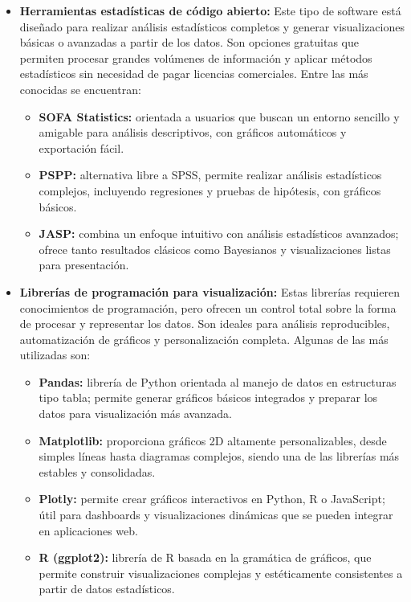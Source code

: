 \documentclass{../../miPlantilla}
\begin{document}
\begin{itemize}
    \item \textbf{Herramientas estadísticas de código abierto:}  
    Este tipo de software está diseñado para realizar análisis estadísticos completos y generar visualizaciones básicas o
    avanzadas a partir de los datos. Son opciones gratuitas que permiten procesar grandes volúmenes de información y aplicar
    métodos estadísticos sin necesidad de pagar licencias comerciales. Entre las más conocidas se encuentran:  
    \begin{itemize}
        \item \textbf{SOFA Statistics:} orientada a usuarios que buscan un entorno sencillo y amigable para análisis descriptivos,
        con gráficos automáticos y exportación fácil.  
        \item \textbf{PSPP:} alternativa libre a SPSS, permite realizar análisis estadísticos complejos, incluyendo regresiones y
        pruebas de hipótesis, con gráficos básicos.  
        \item \textbf{JASP:} combina un enfoque intuitivo con análisis estadísticos avanzados; ofrece tanto resultados clásicos
        como Bayesianos y visualizaciones listas para presentación.
    \end{itemize}

    \item \textbf{Librerías de programación para visualización:}  
    Estas librerías requieren conocimientos de programación, pero ofrecen un control total sobre la forma de procesar y representar
    los datos. Son ideales para análisis reproducibles, automatización de gráficos y personalización completa. Algunas de las más
    utilizadas son:  
    \begin{itemize}
        \item \textbf{Pandas:} librería de Python orientada al manejo de datos en estructuras tipo tabla; permite generar gráficos
        básicos integrados y preparar los datos para visualización más avanzada.  
        \item \textbf{Matplotlib:} proporciona gráficos 2D altamente personalizables, desde simples líneas hasta diagramas complejos,
        siendo una de las librerías más estables y consolidadas.  
        \item \textbf{Plotly:} permite crear gráficos interactivos en Python, R o JavaScript; útil para dashboards y visualizaciones
        dinámicas que se pueden integrar en aplicaciones web.  
        \item \textbf{R (ggplot2):} librería de R basada en la gramática de gráficos, que permite construir visualizaciones
        complejas y estéticamente consistentes a partir de datos estadísticos.
    \end{itemize}


\end{itemize}
\end{document}

